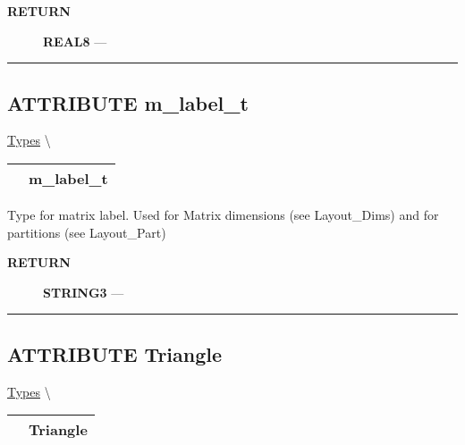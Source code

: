 \par
\begin{description}
\item [\colorbox{tagtype}{\color{white} \textbf{\textsf{RETURN}}}] \textbf{REAL8} --- 
\end{description}




\rule{\linewidth}{0.5pt}
\subsection*{\textsf{\colorbox{headtoc}{\color{white} ATTRIBUTE}
m\_label\_t}}

\hypertarget{ecldoc:pbblas.types.m_label_t}{}
\hspace{0pt} \hyperlink{ecldoc:PBblas.Types}{Types} \textbackslash 

{\renewcommand{\arraystretch}{1.5}
\begin{tabularx}{\textwidth}{|>{\raggedright\arraybackslash}l|X|}
\hline
\hspace{0pt}\mytexttt{\color{red} } & \textbf{m\_label\_t} \\
\hline
\end{tabularx}
}

\par





Type for matrix label. Used for Matrix dimensions (see Layout\_Dims) and for partitions (see Layout\_Part)








\par
\begin{description}
\item [\colorbox{tagtype}{\color{white} \textbf{\textsf{RETURN}}}] \textbf{STRING3} --- 
\end{description}




\rule{\linewidth}{0.5pt}
\subsection*{\textsf{\colorbox{headtoc}{\color{white} ATTRIBUTE}
Triangle}}

\hypertarget{ecldoc:ecldoc-Triangle}{}
\hspace{0pt} \hyperlink{ecldoc:PBblas.Types}{Types} \textbackslash 

{\renewcommand{\arraystretch}{1.5}
\begin{tabularx}{\textwidth}{|>{\raggedright\arraybackslash}l|X|}
\hline
\hspace{0pt}\mytexttt{\color{red} } & \textbf{Triangle} \\
\hline
\end{tabularx}
}

